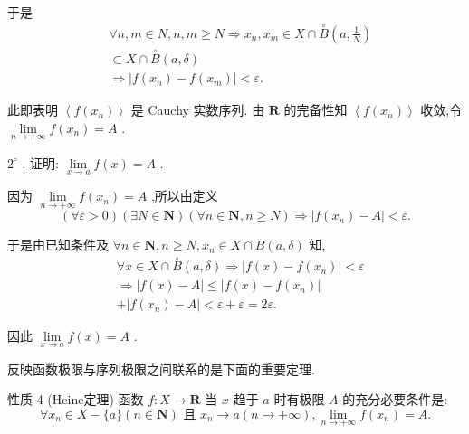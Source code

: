 于是
\begin{align*}
	&\forall n,m \in  N,n,m \geq  N \Rightarrow  {x}_{n},{x}_{m} \in  X \cap  \overset{ \circ  }{B}\left( {a,\frac{1}{N}}\right)\\
	&\subset  X \cap  \overset{ \circ  }{B}\left( {a,\delta }\right)\\
	&\Rightarrow  \left| {f\left( {x}_{n}\right)  - f\left( {x}_{m}\right) }\right|  < \varepsilon .
\end{align*}

此即表明 $\left\langle  {f\left( {x}_{n}\right) }\right\rangle$ 是 Cauchy 实数序列. 由 $\mathbf{R}$ 的完备性知 $\left\langle  {f\left( {x}_{n}\right) }\right\rangle$ 收敛,令 $\mathop{\lim }\limits_{{n \rightarrow   + \infty }}f\left( {x}_{n}\right)  = A$ .

${2}^{ \circ  }$ . 证明: $\mathop{\lim }\limits_{{x \rightarrow  a}}f\left( x\right)  = A$ .

因为 $\mathop{\lim }\limits_{{n \rightarrow   + \infty }}f\left( {x}_{n}\right)  = A$ ,所以由定义
$$\left( {\forall \varepsilon  > 0}\right) \left( {\exists N \in  \mathbf{N}}\right) \left( {\forall n \in  \mathbf{N},n \geq  N}\right)  \Rightarrow  \left| {f\left( {x}_{n}\right)  - A}\right|  < \varepsilon .$$

于是由已知条件及 $\forall n \in  \mathbf{N},n \geq  N,{x}_{n} \in  X \cap  B\left( {a,\delta }\right)$ 知,
\begin{align*}
	&\forall x \in  X \cap  \overset{ \circ  }{B}\left( {a,\delta }\right)  \Rightarrow  \left| {f\left( x\right)  - f\left( {x}_{n}\right) }\right|  < \varepsilon\\
	&\Rightarrow  \left| {f\left( x\right)  - A}\right|  \leq  \left| {f\left( x\right)  - f\left( {x}_{n}\right) }\right|\\
	&+ \left| {f\left( {x}_{n}\right)  - A}\right|  < \varepsilon  + \varepsilon  = {2\varepsilon }.
\end{align*}

因此 $\mathop{\lim }\limits_{{x \rightarrow  a}}f\left( x\right)  = A$ .

反映函数极限与序列极限之间联系的是下面的重要定理.

性质 4 (Heine定理) 函数 $f : X \rightarrow  \mathbf{R}$ 当 $x$ 趋于 $a$ 时有极限 $A$ 的充分必要条件是:
$$\forall {x}_{n} \in  X - \{ a\} \left( {n \in  \mathbf{N}}\right) \text{ 且 }{x}_{n} \rightarrow  a\left( {n \rightarrow   + \infty }\right) ,\mathop{\lim }\limits_{{n \rightarrow   + \infty }}f\left( {x}_{n}\right)  = A.$$

